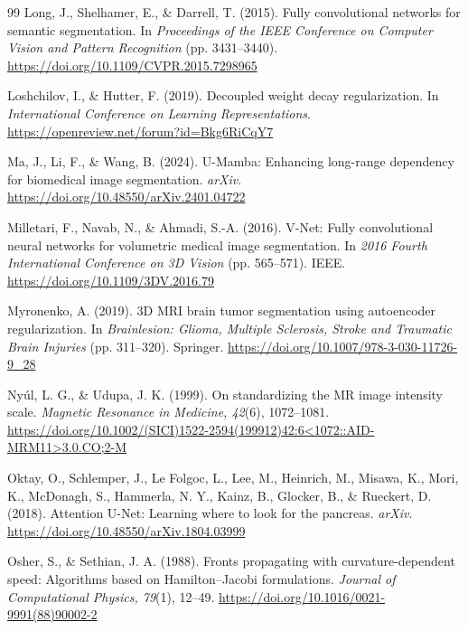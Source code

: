 \begin{thebibliography}{99}
Long, J., Shelhamer, E., \& Darrell, T. (2015). Fully convolutional networks for semantic segmentation. In \textit{Proceedings of the IEEE Conference on Computer Vision and Pattern Recognition} (pp. 3431--3440). \url{https://doi.org/10.1109/CVPR.2015.7298965}

Loshchilov, I., \& Hutter, F. (2019). Decoupled weight decay regularization. In \textit{International Conference on Learning Representations}. \url{https://openreview.net/forum?id=Bkg6RiCqY7}

Ma, J., Li, F., \& Wang, B. (2024). U-Mamba: Enhancing long-range dependency for biomedical image segmentation. \textit{arXiv}. \url{https://doi.org/10.48550/arXiv.2401.04722}

Milletari, F., Navab, N., \& Ahmadi, S.-A. (2016). V-Net: Fully convolutional neural networks for volumetric medical image segmentation. In \textit{2016 Fourth International Conference on 3D Vision} (pp. 565--571). IEEE. \url{https://doi.org/10.1109/3DV.2016.79}

Myronenko, A. (2019). 3D MRI brain tumor segmentation using autoencoder regularization. In \textit{Brainlesion: Glioma, Multiple Sclerosis, Stroke and Traumatic Brain Injuries} (pp. 311--320). Springer. \url{https://doi.org/10.1007/978-3-030-11726-9_28}

Ny{\'u}l, L. G., \& Udupa, J. K. (1999). On standardizing the MR image intensity scale. \textit{Magnetic Resonance in Medicine, 42}(6), 1072--1081. \url{https://doi.org/10.1002/(SICI)1522-2594(199912)42:6<1072::AID-MRM11>3.0.CO;2-M}

Oktay, O., Schlemper, J., Le Folgoc, L., Lee, M., Heinrich, M., Misawa, K., Mori, K., McDonagh, S., Hammerla, N. Y., Kainz, B., Glocker, B., \& Rueckert, D. (2018). Attention U-Net: Learning where to look for the pancreas. \textit{arXiv}. \url{https://doi.org/10.48550/arXiv.1804.03999}

Osher, S., \& Sethian, J. A. (1988). Fronts propagating with curvature-dependent speed: Algorithms based on Hamilton--Jacobi formulations. \textit{Journal of Computational Physics, 79}(1), 12--49. \url{https://doi.org/10.1016/0021-9991(88)90002-2}


\end{thebibliography}
